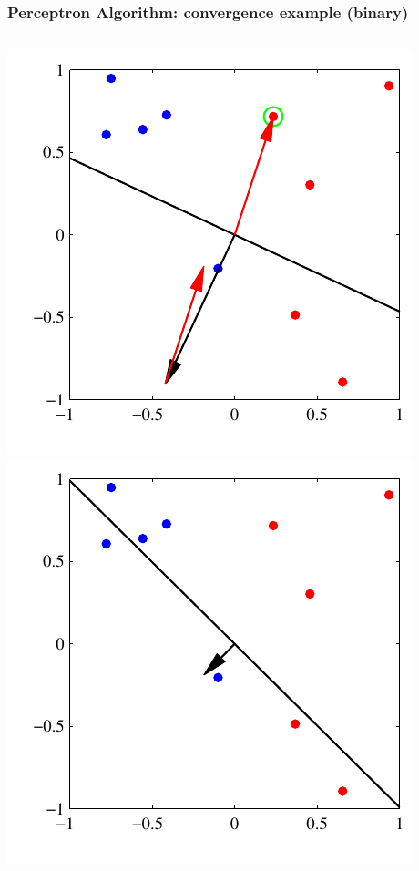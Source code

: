 \documentclass[ignorenonframetext,plain]{beamer}
\begin{document}
\begin{frame}\frametitle{Perceptron Algorithm: convergence example (binary)}
\begin{columns}
\includegraphics[height=.4\textheight]{images/bishop-fig-4-7a.pdf}
\includegraphics[height=.4\textheight]{images/bishop-fig-4-7b.pdf}\\ 

\end{columns}
\end{frame}
\end{document}
